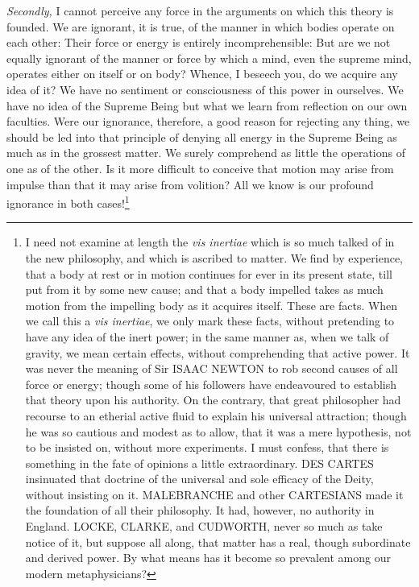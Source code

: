 \documentclass[]{article}
\newcounter{authornote}[page]
\newcommand*{\authornote}[1]{\renewcommand{\thefootnote}{\fnsymbol{footnote}}\stepcounter{authornote}\footnote[\value{authornote}]{#1}\renewcommand{\thefootnote}{\arabic{footnote}}}
\begin{document}
\begin{sectionbody}
\emph{Secondly,} I cannot perceive any force in the arguments on which this theory is founded. We are ignorant, it is true, of the manner in which bodies operate on each other: Their force or energy is entirely incomprehensible: But are we not equally ignorant of the manner or force by which a mind, even the supreme mind, operates either on itself or on body? Whence, I beseech you, do we acquire any idea of it? We have no sentiment or consciousness of this power in ourselves. We have no idea of the Supreme Being but what we learn from reflection on our own faculties. Were our ignorance, therefore, a good reason for rejecting any thing, we should be led into that principle of denying all energy in the Supreme Being as much as in the grossest matter. We surely comprehend as little the operations of one as of the other. Is it more difficult to conceive that motion may arise from impulse than that it may arise from volition? All we know is our profound ignorance in both cases!\authornote{I need not examine at length the \emph{vis inertiae} which is so much talked of in the new philosophy, and which is ascribed to matter. We find by experience, that a body at rest or in motion continues for ever in its present state, till put from it by some new cause; and that a body impelled takes as much motion from the impelling body as it acquires itself. These are facts. When we call this a \emph{vis inertiae}, we only mark these facts, without pretending to have any idea of the inert power; in the same manner as, when we talk of gravity, we mean certain effects, without comprehending that active power. It was never the meaning of Sir ISAAC NEWTON to rob second causes of all force or energy; though some of his followers have endeavoured to establish that theory upon his authority. On the contrary, that great philosopher had recourse to an etherial active fluid to explain his universal attraction; though he was so cautious and modest as to allow, that it was a mere hypothesis, not to be insisted on, without more experiments. I must confess, that there is something in the fate of opinions a little extraordinary. DES CARTES insinuated that doctrine of the universal and sole efficacy of the Deity, without insisting on it. MALEBRANCHE and other CARTESIANS made it the foundation of all their philosophy. It had, however, no authority in England. LOCKE, CLARKE, and CUDWORTH, never so much as take notice of it, but suppose all along, that matter has a real, though subordinate and derived power. By what means has it become so prevalent among our modern metaphysicians?}

\end{sectionbody}
\end{document}
